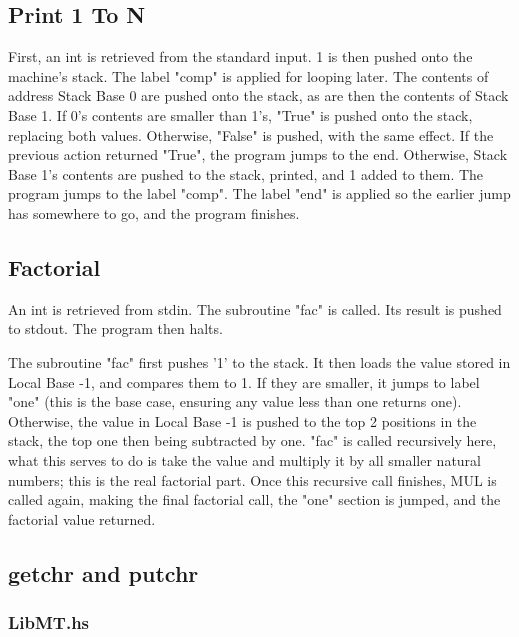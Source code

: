 \documentclass[12pt]{article}
\newcommand{\lstin}[3]{
  
}
\begin{document}
\subsection{Print 1 To N}

\lstin{6}{19}{myTAMCode.hs}

First, an int is retrieved from the standard input. 
1 is then pushed onto the machine's stack. 
The label "comp" is applied for looping later. 
The contents of address Stack Base 0 are pushed onto the stack, as are then the contents of Stack Base 1. 
If 0's contents are smaller than 1's, "True" is pushed onto the stack, replacing both values. 
Otherwise, "False" is pushed, with the same effect. 
If the previous action returned "True", the program jumps to the end. 
Otherwise, Stack Base 1's contents are pushed to the stack, printed, and 1 added to them. 
The program jumps to the label "comp".
The label "end" is applied so the earlier jump has somewhere to go, and the program finishes.


\subsection{Factorial}

\lstin{21}{40}{myTAMCode.hs}

An int is retrieved from stdin. 
The subroutine "fac" is called. 
Its result is pushed to stdout. 
The program then halts.\par

The subroutine "fac" first pushes '1' to the stack. 
It then loads the value stored in Local Base -1, and compares them to 1. 
If they are smaller, it jumps to label "one" (this is the base case, ensuring any value less than one returns one).
Otherwise, the value in Local Base -1 is pushed to the top 2 positions in the stack, the top one then being subtracted by one. 
"fac" is called recursively here, what this serves to do is take the value and multiply it by all smaller natural numbers; this is the real factorial part. 
Once this recursive call finishes, MUL is called again, making the final factorial call, the "one" section is jumped, and the factorial value returned.

\subsection{getchr and putchr}

\subsubsection{LibMT.hs}
\end{document}
